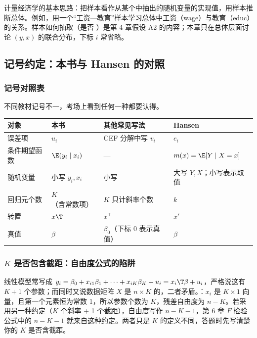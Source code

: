 计量经济学的基本思路：把样本看作从某个中抽出的随机变量的实现值，用样本推断总体。例如，用一个“工资—教育”样本学习总体中工资（wage）与教育（educ）的关系。样本如何抽取（是否 \iid）是第 4 章假设 A2 的内容；本章只在总体层面讨论 $(y,x)$ 的联合分布，下标 $i$ 常省略。

\subsection{记号约定：本书与 Hansen 的对照}

\subsubsection{记号对照表}

不同教材记号不一，考场上看到任何一种都要认得。

\begin{center}
\small
\begin{tabularx}{\linewidth}{lllL}
\toprule
对象 & 本书 & 其他常见写法 & Hansen\\
\midrule
误差项 & $u_i$ & CEF 分解中写 $v_i$ & $e_i$\\
条件期望函数 & $\E(y_i\mid x_i)$ & --- & $m(x)=\E[Y\mid X=x]$\\
随机变量 & 小写 $y_i,x_i$ & 小写 & 大写 $Y,X$；小写表示取值\\
回归元个数 & $K$（含常数项） & $K$ 只计斜率个数 & $k$\\
转置 & $x\T$ & $x^\top$ & $x'$\\
真值 & $\beta$ & $\beta_0$（下标 0 表示真值） & $\beta$\\
\bottomrule
\end{tabularx}
\end{center}

\subsubsection{\texorpdfstring{$K$}{K} 是否包含截距：自由度公式的陷阱}

\begin{note}[$K$ 是否包含截距]
线性模型常写成 $y_i=\beta_0+x_{i1}\beta_1+\cdots+x_{iK}\beta_K+u_i=x_i\T\beta+u_i$，严格说这有 $K+1$ 个参数；而同时又说数据矩阵 $X$ 是 $n\times K$ 的，二者矛盾。：$x_i$ 是 $K\times1$ 向量，且第一个元素恒为常数 1，所以参数个数为 $K$，残差自由度为 $n-K$。若采用另一种约定（$K$ 个斜率 $+$ 1 个截距），自由度写作 $n-K-1$，第 6 章 $F$ 检验公式中的 $n-K-1$ 就来自这种约定。两者只是 $K$ 的定义不同，答题时先写清楚你的 $K$ 是否含截距。
\end{note}

